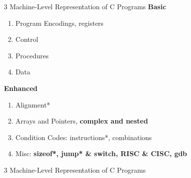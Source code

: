 \documentclass{beamer}
\begin{document}
\begin{frame}{3 Machine-Level Representation of C Programs}
\textbf{Basic}
\begin{enumerate}
	\item Program Encodings, registers
	\item Control
	\item Procedures
	\item Data
\end{enumerate}
\textbf{Enhanced}
\begin{enumerate}
	\item Alignment*
	\item Arrays and Pointers, \textbf{complex and nested}
	\item Condition Codes: instructions*, combinations
	\item Misc: \textbf{sizeof*, jump* \& switch, RISC \& CISC, gdb}
\end{enumerate}
\end{frame}

\begin{frame}{3 Machine-Level Representation of C Programs}
	\only<1> {
	}
	 {
	}
\end{frame}
\end{document}
